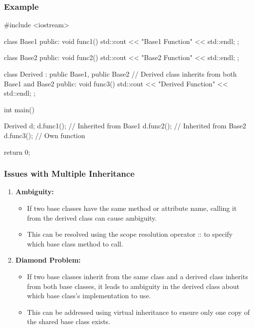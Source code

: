 \documentclass{report}
\begin{document}
    \bigbreak \noindent 
    \subsubsection{Example}
    \bigbreak \noindent 
    \begin{cppcode}
#include <iostream>

class Base1 {
public:
    void func1() {
        std::cout << "Base1 Function" << std::endl;
    }
};

class Base2 {
public:
    void func2() {
        std::cout << "Base2 Function" << std::endl;
    }
};

class Derived : public Base1, public Base2 {
    // Derived class inherits from both Base1 and Base2
public:
    void func3() {
        std::cout << "Derived Function" << std::endl;
    }
};

int main() {
    Derived d;
    d.func1(); // Inherited from Base1
    d.func2(); // Inherited from Base2
    d.func3(); // Own function

    return 0;
}
    \end{cppcode}

    \bigbreak \noindent 
    \subsubsection{Issues with Multiple Inheritance}
    \begin{enumerate}
        \item \textbf{Ambiguity:}
        \begin{itemize}
            \item If two base classes have the same method or attribute name, calling it from the derived class can cause ambiguity.
            \item This can be resolved using the scope resolution operator :: to specify which base class method to call.
        \end{itemize}
    \item \textbf{Diamond Problem:}
        \begin{itemize}
            \item If two base classes inherit from the same class and a derived class inherits from both base classes, it leads to ambiguity in the derived class about which base class's implementation to use.
            \item This can be addressed using virtual inheritance to ensure only one copy of the shared base class exists.
        \end{itemize}
    \end{enumerate}
    \pagebreak 
\end{document}
